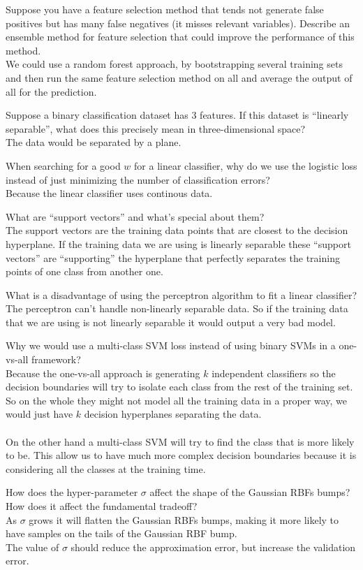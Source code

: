 \documentclass{article}
\def\ans#1{{\color{ans}#1}}
\begin{document}
{{}
\item Suppose you have a feature selection method that tends not generate false positives but has many false negatives (it misses relevant variables). Describe an ensemble method for feature selection that could improve the performance of this method. \\
\ans{
    We could use a random forest approach, by bootstrapping several training sets and then run the 
    same feature selection method on all and average the output of all for the prediction.
}
\item Suppose a binary classification dataset has 3 features. If this dataset is ``linearly separable'', what does this precisely mean in three-dimensional space? \\
\ans{
    The data would be separated by a plane.
}
\item When searching for a good $w$ for a linear classifier, why do we use the logistic loss instead of just minimizing the number of classification errors? \\
\ans{
    Because the linear classifier uses continous data.
}
\item What are ``support vectors'' and what's special about them? \\
\ans{
    The support vectors are the training data points that are closest to the decision hyperplane. If the 
    training data we are using is linearly separable these ``support vectors'' are ``supporting'' the 
    hyperplane that perfectly separates the training points of one class from another one.
}
\item What is a disadvantage of using the perceptron algorithm to fit a linear classifier? \\
\ans{
    The perceptron can't handle non-linearly separable data. So if the training data that we are 
    using is not linearly separable it would output a very bad model.
}
\item Why we would use a multi-class SVM loss instead of using binary SVMs in a one-vs-all framework? \\
\ans{
    Because the one-vs-all approach is generating $k$ independent classifiers so the decision boundaries 
    will try to isolate each class from the rest of the training set. So on the whole they might not 
    model all the training data in a proper way, we would just have $k$ decision hyperplanes separating 
    the data. \\ \\
    On the other hand a multi-class SVM will try to find the class that is more likely to 
    be. This allow us to have much more complex decision boundaries because it is considering all 
    the classes at the training time.
}
\item How does the hyper-parameter $\sigma$ affect the shape of the Gaussian RBFs bumps? How does it affect the fundamental tradeoff? \\
\ans{
    As $\sigma$ grows it will flatten the Gaussian RBFs bumps, making it more likely to have samples 
    on the tails of the Gaussian RBF bump. \\
    The value of $\sigma$ should reduce the approximation error, but increase the validation error.
}
}
\end{document}
